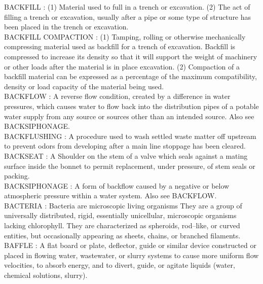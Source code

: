 \vspace{0.15cm}
BACKFILL :  (1) Material used to full in a trench or excavation. (2) The act of filling a trench or excavation, usually after a pipe or some type of structure has been placed in the trench or excavation. \\
\vspace{0.15cm}
BACKFILL COMPACTION :  (1) Tamping, rolling or otherwise mechanically compressing material used as backfill for a trench of excavation. Backfill is compressed to increase its density so that it will support the weight of machinery or other loads after the material is in place  excavation. (2) Compaction of a backfill material can be expressed as a percentage of the maximum compatibility, density or load capacity of the material being used. \\
\vspace{0.15cm}
BACKFLOW :  A reverse flow condition, created by a difference in water pressures, which causes water to flow back into the distribution pipes of a potable water supply from any source or sources other than an intended source. Also see BACKSIPHONAGE.\\
\vspace{0.15cm}
BACKFLUSHING :  A procedure used to wash settled waste matter off upstream to prevent odors from developing after a main line stoppage has been cleared. \\
\vspace{0.15cm}
BACKSEAT :   A Shoulder on the stem of a valve which seals against a mating surface inside the bonnet to permit replacement, under pressure, of stem seals or packing.\\
\vspace{0.15cm}
BACKSIPHONAGE :  A form of backflow caused by a negative or below atmospheric pressure within a water system. Also see BACKFLOW.\\
\vspace{0.15cm}
BACTERIA :   Bacteria are microscopic living organisms They are a group of universally distributed, rigid, essentially unicellular, microscopic organisms lacking chlorophyll. They are characterized as spheroids, rod–like, or curved entities, but occasionally appearing as sheets, chains, or branched filaments.\\
\vspace{0.15cm}
BAFFLE :  A flat board or plate, deflector, guide or similar device constructed or placed in flowing water, wastewater, or slurry systems to cause more uniform flow velocities, to absorb energy, and to divert, guide, or agitate liquids (water, chemical solutions, slurry).\\
